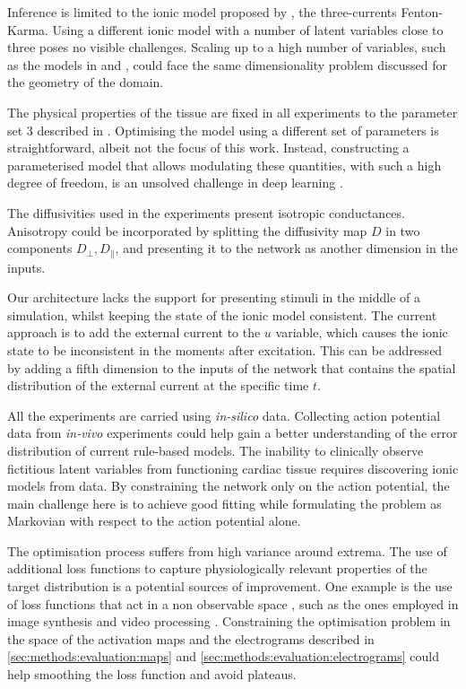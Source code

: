 \documentclass[utf8]{frontiersSCNS} %
\begin{document}
Inference is limited to the ionic model proposed by \cite{Fenton1998}, the three-currents Fenton-Karma. Using a different ionic model with a number of latent variables close to three poses no visible challenges. Scaling up to a high number of variables, such as the models in  \cite{TenTusscher2006ComparisonTissues} and 
\cite{Iyer2004AMyocyte}, could face the same dimensionality problem discussed for the geometry of the domain.

The physical properties of the tissue are fixed in all experiments to the parameter set 3 described in \cite{Fenton2002}. Optimising the model using a different set of parameters is straightforward, albeit not the focus of this work. Instead, constructing a parameterised model that allows modulating these quantities, with such a high degree of freedom, is an unsolved challenge in deep learning \cite[]{kim2019deep}.

The diffusivities used in the experiments present isotropic conductances. Anisotropy could be incorporated by splitting the diffusivity map $D$ in two components $D_\bot, D_\parallel$, and presenting it to the network as another dimension in the inputs.

Our architecture lacks the support for presenting stimuli in the middle of a simulation, whilst keeping the state of the ionic model consistent. The current approach is to add the external current to the $u$ variable, which causes the ionic state to be inconsistent in the moments after excitation. This can be addressed by adding a fifth dimension to the inputs of the network that contains the spatial distribution of the external current at the specific time $t$.

All the experiments are carried using \textit{in-silico} data. Collecting action potential data from \textit{in-vivo} experiments could help gain a better understanding of the error distribution of current rule-based models.
The inability to clinically observe fictitious latent variables from functioning cardiac tissue requires discovering ionic models from data.
By constraining the network only on the action potential, the main challenge here is to achieve good fitting while formulating the problem as Markovian with respect to the action potential alone.

The optimisation process suffers from high variance around extrema.
The use of additional loss functions to capture physiologically relevant properties of the target distribution is a potential sources of improvement.
One example is the use of loss functions that act in a non observable space \cite[]{johnson2016perceptual}, such as the ones employed in image synthesis and video processing \cite[]{zhang2018unreasonable,lai2018learning}. Constraining the optimisation problem in the space of the activation maps and the electrograms described in \ref{sec:methods:evaluation:maps} and \ref{sec:methods:evaluation:electrograms} could help smoothing the loss function and avoid plateaus.
\end{document}
